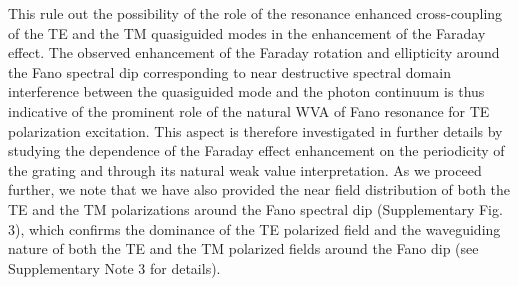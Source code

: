 \documentclass[13pt]{article}
\begin{document}
This rule out the possibility of the role of the resonance enhanced cross-coupling of the TE and the TM quasiguided modes in the enhancement of the Faraday effect. The observed enhancement of the Faraday rotation and ellipticity around the Fano spectral dip corresponding to near destructive spectral domain interference between the quasiguided mode and the photon continuum is thus indicative of the prominent role of the natural WVA of Fano resonance for TE polarization excitation. This aspect is therefore investigated in further details by studying the dependence of the Faraday effect enhancement on the periodicity of the grating and through its natural weak value interpretation. As we proceed further, we note that we have also provided the near field distribution of both the TE and the TM polarizations around the Fano spectral dip (Supplementary Fig. 3), which confirms the dominance of the TE polarized field and the waveguiding nature of both the TE and the TM polarized fields around the Fano dip (see Supplementary Note 3 for details). 
	
\end{document}
